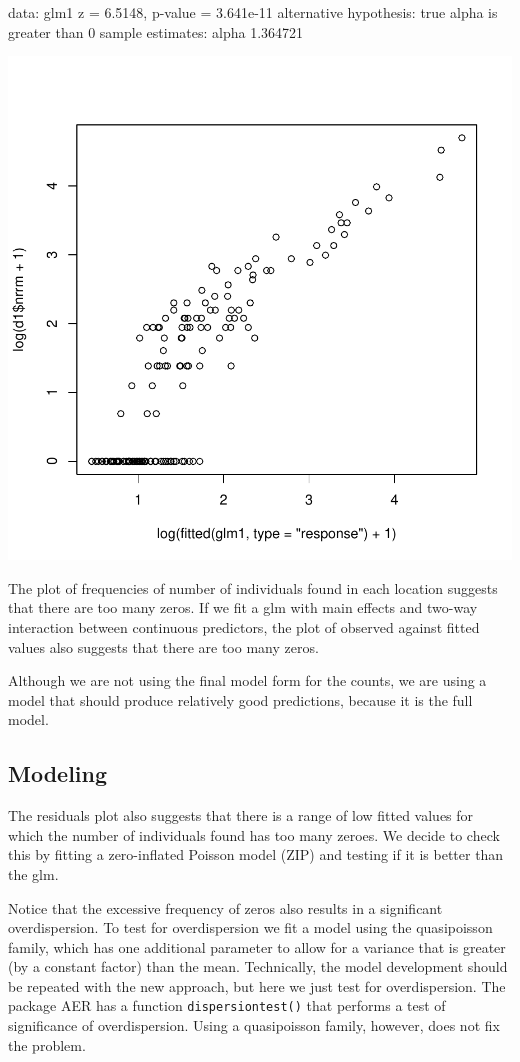 \documentclass{article}
\begin{document}
\begin{Schunk}
\begin{Soutput}
data:  glm1
z = 6.5148, p-value = 3.641e-11
alternative hypothesis: true alpha is greater than 0
sample estimates:
   alpha 
1.364721 
\end{Soutput}
\end{Schunk}
\includegraphics{HW08ZIPlogistic-glm1}

The plot of frequencies of number of individuals found in each location suggests that there are too many zeros. If we fit a glm with main effects and two-way interaction between continuous predictors, the plot of observed against fitted values also suggests that there are too many zeros.

Although we are not using the final model form for the counts, we are using a model that should produce relatively good predictions, because it is the full model.

\subsection{Modeling}

The residuals plot also suggests that there is a range of low fitted values for which the number of individuals found has too many zeroes. We decide to check this by fitting a zero-inflated Poisson model (ZIP) and testing if it is better than the glm.

Notice that the excessive frequency of zeros also results in a significant overdispersion. To test for overdispersion we fit a model using the quasipoisson family, which has one additional parameter to allow for a variance that is greater (by a constant factor) than the mean. Technically, the model development should be repeated with the new approach, but here we just test for overdispersion. The package AER has a function \verb!dispersiontest()! that performs a test of significance of overdispersion.
Using a quasipoisson family, however, does not fix the problem.
\end{document}
